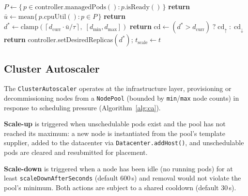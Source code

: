 \documentclass[ASNA,twocolumn]{USG}
\begin{document}
    \begin{algorithm}[t]
\caption{HPA Reconciliation Loop}\label{alg:hpa}
\begin{algorithmic}[1]
        \State $P \leftarrow \{\,p \in \mathrm{controller.managedPods()} : p.\mathrm{isReady}()\,\}$
         \State \textbf{return} \EndIf
        \State $\bar{u} \leftarrow \mathrm{mean}\{\,p.\mathrm{cpuUtil}() : p \in P\,\}$
         \State \textbf{return}
             \EndIf
        \State $d^* \leftarrow \mathrm{clamp}\!\left(\left\lceil d_{\mathrm{curr}} \cdot
                                                         \bar{u}/\tau \right\rceil,\;[d_{\min}, d_{\max}]\right)$
         \State \textbf{return} \EndIf
        \State $\mathrm{cd} \leftarrow (d^* > d_{\mathrm{curr}})\;?\;
            \mathrm{cd}_{\uparrow}\;:\;\mathrm{cd}_{\downarrow}$
         \State \textbf{return} \EndIf
        \State controller.setDesiredReplicas$(d^*)$;\quad
            $t_{\mathrm{scale}} \leftarrow t$
    \EndProcedure
\end{algorithmic}
    \end{algorithm}

    \subsection{Cluster Autoscaler}

    The \texttt{ClusterAutoscaler} operates at the infrastructure layer,
    provisioning or decommissioning nodes from a \texttt{NodePool}
    (bounded by \texttt{min}/\texttt{max} node counts) in response to
    scheduling pressure (Algorithm~\ref{alg:ca}).

    \textbf{Scale-up} is triggered when unschedulable pods exist and the
    pool has not reached its maximum: a new node is instantiated from the
    pool's template supplier, added to the datacenter via
    \texttt{Datacenter.addHost()}, and unschedulable pods are cleared and
    resubmitted for placement.

    \textbf{Scale-down} is triggered when a node has been idle (no
    running pods) for at least \texttt{scaleDownAfterSeconds} (default
    600\,s) and removal would not violate the pool's minimum. Both actions
    are subject to a shared cooldown (default 30\,s).
\end{document}
